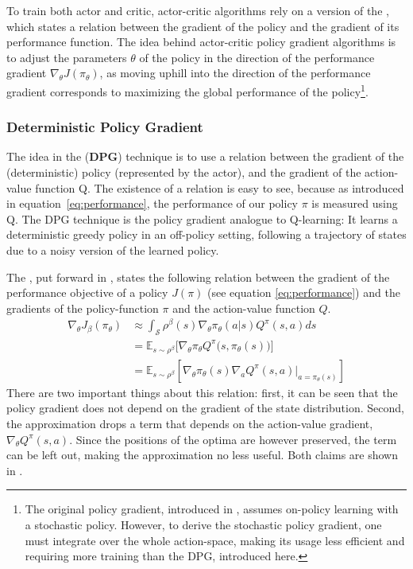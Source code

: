 To train both actor and critic, actor-critic algorithms rely on a version of the , which states a relation between the gradient of the policy and the gradient of its performance function. The idea behind actor-critic policy gradient algorithms is to adjust the parameters $\theta$ of the policy in the direction of the performance gradient $\nabla_{\theta}J(\pi_\theta)$, as moving uphill into the direction of the performance gradient corresponds to maximizing the global performance of the policy\footnote{The original policy gradient, introduced in \cite{sutton_policy_2000}, assumes on-policy learning with a stochastic policy. However, to derive the stochastic policy gradient, one must integrate over the whole action-space, making its usage less efficient and requiring more training than the DPG, introduced here.}. 

\subsubsection{Deterministic Policy Gradient}

The idea in the  (\textbf{DPG}) technique is to use a relation between the gradient of the (deterministic) policy (represented by the actor), and the gradient of the action-value function Q. The existence of a relation is easy to see, because as introduced in equation~\ref{eq:performance}, the performance of our policy $\pi$ is measured using Q. The DPG technique is the policy gradient analogue to Q-learning: It learns a deterministic greedy policy in an off-policy setting, following a trajectory of states due to a noisy version of the learned policy.

The , put forward in \cite{silver_deterministic_2014}, states the following relation between the gradient of the performance objective of a policy $J(\pi)$ (see equation \ref{eq:performance}) and the gradients of the policy-function $\pi$ and the action-value function $Q$. 
\begin{align}
	\nabla_{\theta}J_\beta(\pi_\theta) &\approx \int_{\mathcal{S}} \rho^\beta(s) \nabla_\theta \pi_{\theta}(a|s)Q^\pi(s,a) ds \nonumber \\
	    &= \mathds{E}_{s\sim\rho^\beta} \Big[ \nabla_\theta \pi_\theta Q^\pi \big(s,\pi_\theta(s)\big)   \Big] \nonumber \\
		&= \mathds{E}_{s\sim\rho^\beta} \left[  \nabla_\theta \pi_{\theta}(s) \nabla_a Q^\pi(s,a) \big|_{a=\pi_\theta(s)} \right]  \label{eq:dpg}
\end{align}
There are two important things about this relation: first, it can be seen that the policy gradient does not depend on the gradient of the state distribution. Second, the approximation drops a term that depends on the action-value gradient, $\nabla_{\theta} Q^\pi(s,a)$. Since the positions of the optima are however preserved, the term can be left  out, making the approximation no less useful. Both claims are shown in \cite{silver_deterministic_2014}.\\ 


